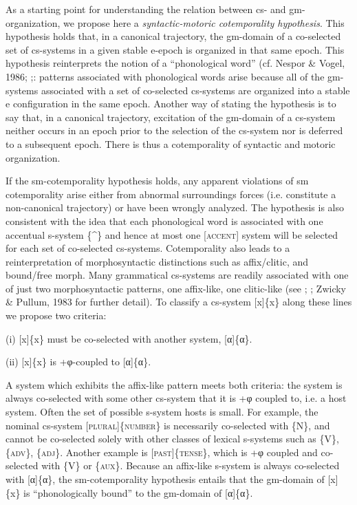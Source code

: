 As a starting point for understanding the relation between cs- and gm-organization, we propose here a \textit{syntactic-motoric cotemporality hypothesis}. This hypothesis holds that, in a canonical trajectory, the gm-domain of a co-selected set of cs-systems in a given stable e-epoch is organized in that same epoch. This hypothesis reinterprets the notion of a “phonological word” (cf. Nespor \& Vogel, 1986; \citealt{Selkirk1984,Selkirk2011};: patterns associated with phonological words arise because all of the gm-systems associated with a set of co-selected cs-systems are organized into a stable e configuration in the same epoch. Another way of stating the hypothesis is to say that, in a canonical trajectory, excitation of the gm-domain of a cs-system neither occurs in an epoch prior to the selection of the cs-system nor is deferred to a subsequent epoch. There is thus a cotemporality of syntactic and motoric organization. 

  If the sm-cotemporality hypothesis holds, any apparent violations of sm cotemporality arise either from abnormal surroundings forces (i.e. constitute a non-canonical trajectory) or have been wrongly analyzed. The hypothesis is also consistent with the idea that each phonological word is associated with one accentual s-system \{\^{}\} and hence at most one [\textsc{accent}] system will be selected for each set of co-selected cs-systems. Cotemporality also leads to a reinterpretation of morphosyntactic distinctions such as affix/clitic, and bound/free morph. Many grammatical cs-systems are readily associated with one of just two morphosyntactic patterns, one affix-like, one clitic-like (see \citealt{Payne1997}; \citealt{Zwicky1985}; Zwicky \& Pullum, 1983 for further detail). To classify a cs-system [x]\{x\} along these lines we propose two criteria:

    (i)   [x]\{x\} must be co-selected with another system, [α]\{α\}.

    (ii)   [x]\{x\} is +φ-coupled to [α]\{α\}.

  A system which exhibits the affix-like pattern meets both criteria: the system is always co-selected with some other cs-system that it is +φ coupled to, i.e. a host system. Often the set of possible s-system hosts is small. For example, the nominal cs-system [\textsc{plural}]\{\textsc{number}\} is necessarily co-selected with \{N\}, and cannot be co-selected solely with other classes of lexical s-systems such as \{V\}, \{\textsc{adv}\}, \{\textsc{adj}\}. Another example is [\textsc{past}]\{\textsc{tense}\}, which is +φ coupled and co-selected with \{V\} or \{\textsc{aux}\}. Because an affix-like s-system is always co-selected with [α]\{α\}, the sm-cotemporality hypothesis entails that the gm-domain of [x]\{x\} is “phonologically bound” to the gm-domain of [α]\{α\}. 

